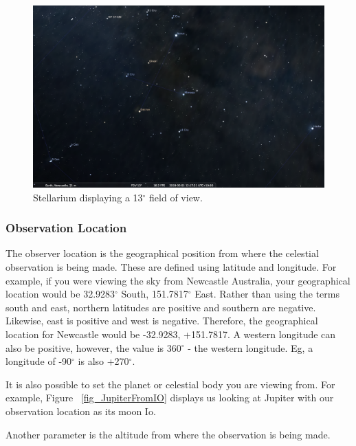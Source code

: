 \begin{figure}[htbp]
	\centering
	\includegraphics[width=1\columnwidth]{fov13}
	\caption{Stellarium displaying a 13$^{\circ}$ field of view.}
	\label{fig:fov13}
\end{figure}

\subsubsection{Observation Location}
The observer location is the geographical position from where the celestial observation is being made. These are defined using latitude and longitude. For example, if you were viewing the sky from Newcastle Australia, your geographical location would be  32.9283$^{\circ}$ South, 151.7817$^{\circ}$ East. Rather than using the terms south and east, northern latitudes are positive and southern are negative. Likewise, east is positive and west is negative. Therefore, the geographical location for Newcastle would be -32.9283, +151.7817.  A western longitude can also be positive, however, the value is 360$^{\circ}$ - the western longitude. Eg, a longitude of -90$^{\circ}$ is also +270$^{\circ}$.

It is also possible to set the planet or celestial body you are viewing from. 
For example, Figure ~\ref{fig_JupiterFromIO} displays us looking at Jupiter with our observation location as its moon Io.

Another parameter is the altitude from where the observation is being made. 

